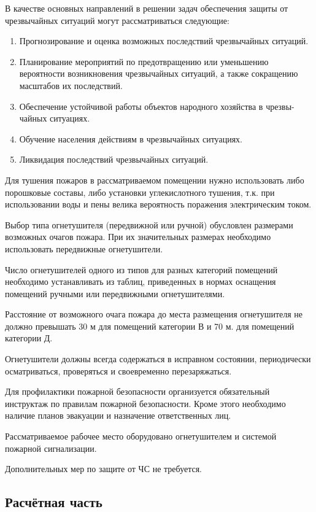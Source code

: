 В качестве основных направлений в решении задач обеспечения защиты от чрезвычайных ситуаций могут рассматриваться следующие:

\begin{enumerate}[1.]
	\item Прогнозирование и оценка возможных последствий чрезвычайных ситуаций.
	\item Планирование мероприятий по предотвращению или уменьшению вероятности возникновения чрезвычайных ситуаций, а также сокращению масштабов их последствий.
	\item Обеспечение устойчивой работы объектов народного хозяйства в чрезвы-чайных ситуациях.
	\item Обучение населения действиям в чрезвычайных ситуациях.
	\item Ликвидация последствий чрезвычайных ситуаций.
\end{enumerate}

Для тушения пожаров в рассматриваемом помещении нужно использовать либо порошковые составы, либо установки углекислотного тушения, т.к. при использовании воды и пены велика вероятность поражения электрическим током.

Выбор типа огнетушителя (передвижной или ручной) обусловлен размерами возможных очагов пожара. При их значительных размерах необходимо использовать передвижные огнетушители.

Число огнетушителей одного из типов для разных категорий помещений необходимо устанавливать из таблиц, приведенных в нормах оснащения помещений ручными или передвижными огнетушителями.

Расстояние от возможного очага пожара до места размещения огнетушителя не должно превышать 30 м для помещений категории В и 70 м. для помещений категории Д.

Огнетушители должны всегда содержаться в исправном состоянии, периодически осматриваться, проверяться и своевременно перезаряжаться.

Для профилактики пожарной безопасности организуется обязательный инструктаж по правилам пожарной безопасности. Кроме этого необходимо наличие планов эвакуации и назначение ответственных лиц.

Рассматриваемое рабочее место оборудовано огнетушителем и системой пожарной сигнализации.

Дополнительных мер по защите от ЧС не требуется.

\subsection{Расчётная часть}

